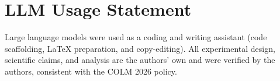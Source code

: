 \documentclass{article}
\begin{document}
\section*{LLM Usage Statement}
Large language models were used as a coding and writing assistant (code scaffolding, LaTeX
preparation, and copy-editing). All experimental design, scientific claims, and analysis are the
authors' own and were verified by the authors, consistent with the COLM 2026 policy.



\end{document}
